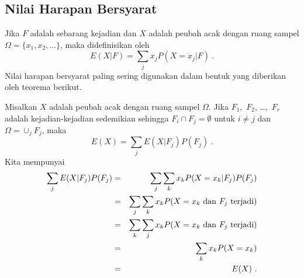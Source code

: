 \subsection*{Nilai Harapan Bersyarat}

\begin{definition}\label{def 6.3} Jika $F$ adalah sebarang kejadian dan $X$ adalah
peubah acak dengan ruang sampel $\Omega = \{x_1, x_2, \ldots\}$, maka
didefinisikan oleh
$$ E(X|F) = \sum_j x_j P(X = x_j|F)\ .
$$ Nilai harapan bersyarat paling sering digunakan dalam bentuk yang diberikan oleh
teorema berikut.
\end{definition}

\begin{theorem}\label{thm 6.5} Misalkan $X$ adalah peubah acak dengan ruang sampel
$\Omega$. Jika $F_1$,~$F_2$, \dots,~$F_r$ adalah kejadian-kejadian sedemikian sehingga
$F_i \cap F_j = \emptyset$ untuk $i \ne j$ dan $\Omega = \cup_j F_j$, maka
$$ E(X) = \sum_j E(X|F_j) P(F_j)\ .
$$
\proof Kita mempunyai
\begin{eqnarray*}
\sum_j E(X|F_j) P(F_j) & = & \sum_j \sum_k x_k P(X = x_k|F_j) P(F_j) \\
                       & = & \sum_j \sum_k x_k P(X = x_k\,\, {\rm dan}\,\, 
F_j\,\,{\rm terjadi}) \\
                       & = & \sum_k \sum_j x_k P(X = x_k\,\,{\rm dan}\,\,F_j\,\,{\rm
terjadi})
\\
                       & = & \sum_k x_k P(X = x_k) \\
                       & = & E(X)\ .
\end{eqnarray*}
\end{theorem}

